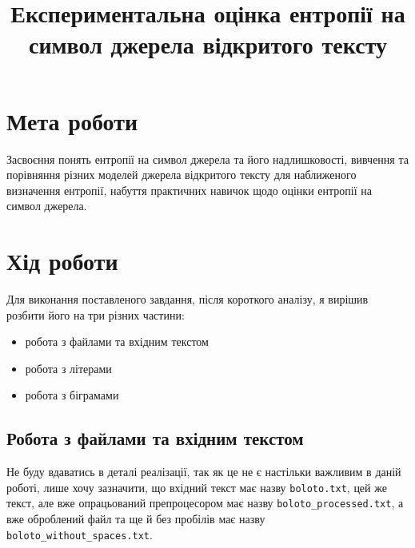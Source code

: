 \documentclass[12pt]{article}
\title{\textbf{Експериментальна оцінка ентропії на символ джерела відкритого тексту}}
\author{}
\date{}
\begin{document}
\maketitle
\section{Мета роботи}
\quad Засвоєння понять ентропії на символ джерела та його надлишковості, вивчення та порівняння різних моделей джерела відкритого тексту для наближеного визначення ентропії, набуття практичних навичок щодо оцінки ентропії на символ джерела.

\section{Хід роботи}
\quad Для виконання поставленого завдання, після короткого аналізу, я вирішив розбити його на три різних частини: 
\begin{itemize}
    \item робота з файлами та вхідним текстом
    \item робота з літерами
    \item робота з біграмами
\end{itemize}

\subsection{Робота з файлами та вхідним текстом}
\quad Не буду вдаватись в деталі реалізації, так як це не є настільки важливим в даній роботі, лише хочу зазначити, що вхідний текст має назву \texttt{boloto.txt}, цей же текст, але вже опрацьований препроцесором має назву \texttt{boloto\_processed.txt}, а вже оброблений файл та ще й без пробілів має назву \texttt{boloto\_without\_spaces.txt}.
\end{document}
